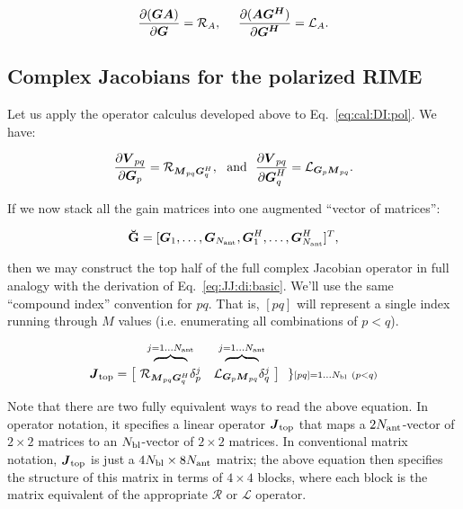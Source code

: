 \documentclass[useAMS,usenatbib]{mn2e}
\newcommand{\mat}[1]{{\bmath{#1}}}
\newcommand{\JJ}{\mat{J}} %
\newcommand{\MM}{\mat{M}}
\newcommand{\VV}{\mat{V}}
\newcommand{\GG}{\mat{G}}
\begin{document}
\[
\frac{\partial(\mat{GA})}{\partial{\mat{G}}} = \Rop{A},~~~~\frac{\partial(\mat{AG^H})}{\partial{\mat{G^H}}} = \Lop{A}.
\]

\subsection{Complex Jacobians for the polarized RIME}

Let us apply the operator calculus developed above to Eq.~\ref{eq:cal:DI:pol}. We have:

\begin{equation}
\label{eq:dR:dG}
\frac{\partial\VV_{pq}}{\partial\GG_p} = \Rop{\MM_{pq}\GG^H_q},\mathrm{~~and~~}
\frac{\partial\VV_{pq}}{\partial\GG^H_q} = \Lop{\GG_p \MM_{pq}}.
\end{equation}

If we now stack all the gain matrices into one augmented ``vector of matrices'':

\begin{equation}
\label{eq:GGvec}
\GGg = [ \GG_1,\dots,\GG_{\scriptstyle \Na},\GG^H_1,\dots,\GG^H_{\scriptstyle \Na} ]^T,
\end{equation}

then we may construct the top half of the full complex Jacobian operator in full analogy with the 
derivation of Eq.~\ref{eq:JJ:di:basic}. We'll use the same ``compound index'' convention for $pq$. That is, 
$[pq]$ will represent a single index running through $M$ values (i.e. enumerating all combinations of $p<q$).

\begin{equation}
\label{eq:JJtop}
\begin{array}{r@{~}cc@{~}cc}
  & \overbrace{~~~~~~~~}^{j=1\dots \Na} & \overbrace{~~~~~~~~}^{j=1\dots \Na} \\

\JJ_\mathrm{top} = \big [ & 
\Rop{ \MM_{pq}\GG^H_q }\delta^j_p & 
\Lop{ \GG_p \MM_{pq}  }\delta^j_q 
& \big ] ~~ \} \scriptstyle [pq]=1\dots \Nbl~(p<q)
% 
\end{array}
\end{equation}

Note that there are two fully equivalent ways to read the above equation. In operator notation, it specifies a linear operator $\JJ_\mathrm{top}$
that maps a $2N_\mathrm{ant}$-vector of $2\times2$ matrices to an $N_\mathrm{bl}$-vector of $2\times2$ matrices. In conventional matrix notation, 
$\JJ_\mathrm{top}$ is just a $4N_\mathrm{bl}\times8N_\mathrm{ant}$ matrix; the above equation then specifies the structure of this matrix in terms
of $4\times4$ blocks, where each block is the matrix equivalent of the appropriate $\mathcal{R}$ or $\mathcal{L}$ operator.
\end{document}
